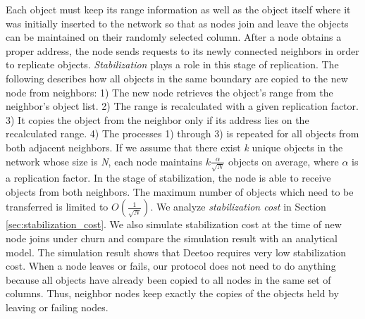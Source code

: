 \documentclass[conference]{IEEEtran}
\begin{document}
Each object must keep its range information as well as the object itself where 
it was initially inserted to the network so that as nodes join and
leave the objects can be maintained on their randomly selected column.
After a node obtains a proper address, the node sends requests to 
its newly connected neighbors in order to replicate objects.  
\emph{Stabilization} plays a role in this stage of replication. 
The following describes how all objects in the same boundary are 
copied to the new node from neighbors: 1) The new node retrieves the object's range
from the neighbor's object list. 2) The range is recalculated with a given 
replication factor. 3) It copies the object from the neighbor only if its address
lies on the recalculated range. 4) The processes 1) through 3) is repeated 
for all objects from both adjacent neighbors.
If we assume that there exist \emph{k} unique objects in the network whose size is \emph{N}, 
each node maintains $k\frac{\alpha}{\sqrt{N}}$ objects on average, where $\alpha$ is a 
replication factor. In the stage of stabilization, the node is able to receive objects 
from both neighbors. The maximum number of objects which need to be transferred is limited to 
$O(\frac{1}{\sqrt{N}})$.
We analyze \emph{stabilization cost} in Section \ref{sec:stabilization_cost}. 
We also simulate stabilization cost at the time of new node joins 
under churn and compare the simulation result with an analytical model.  
The simulation result shows that Deetoo requires very low stabilization cost. 
When a node leaves or fails, our protocol
does not need to do anything because all objects have already been copied to
all nodes in the same set of columns. Thus, neighbor nodes keep exactly
the copies of the objects held by leaving or failing nodes.

\iffalse
\end{document}
